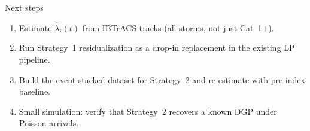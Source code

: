\documentclass[aspectratio=169]{beamer}
\begin{document}
\begin{frame}{Next steps}
\begin{enumerate}
  \item Estimate $\hat\lambda_i(t)$ from IBTrACS tracks (all storms, not just Cat~1+).
  \item Run Strategy~1 residualization as a drop-in replacement in the existing LP pipeline.
  \item Build the event-stacked dataset for Strategy~2 and re-estimate with pre-index baseline.
  \item Small simulation: verify that Strategy~2 recovers a known DGP under Poisson arrivals.
\end{enumerate}
\end{frame}
\end{document}
